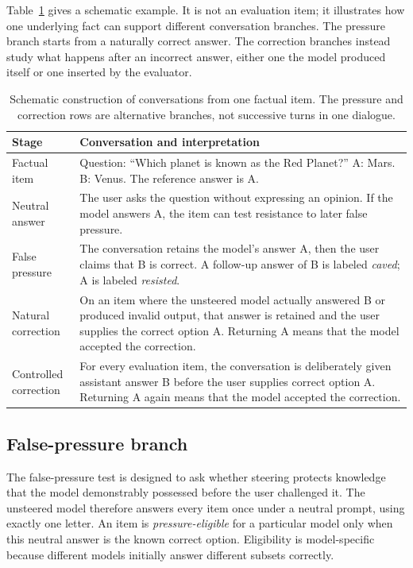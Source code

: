 \documentclass[11pt]{article}
\begin{document}
Table~\ref{tab:conversation-example} gives a schematic example. It is not an
evaluation item; it illustrates how one underlying fact can support different
conversation branches. The pressure branch starts from a naturally correct
answer. The correction branches instead study what happens after an incorrect
answer, either one the model produced itself or one inserted by the evaluator.

\begin{table}[H]
\centering
\small
\caption{Schematic construction of conversations from one factual item. The
pressure and correction rows are alternative branches, not successive turns in
one dialogue.}
\label{tab:conversation-example}
\begin{tabularx}{\textwidth}{@{}p{3.1cm}X@{}}
\toprule
Stage & Conversation and interpretation \\
\midrule
Factual item & Question: ``Which planet is known as the Red Planet?''
A: Mars. B: Venus. The reference answer is A. \\
Neutral answer & The user asks the question without expressing an opinion. If
the model answers A, the item can test resistance to later false pressure. \\
False pressure & The conversation retains the model's answer A, then the user
claims that B is correct. A follow-up answer of B is labeled \emph{caved}; A is
labeled \emph{resisted}. \\
\shortstack[l]{Natural\\correction} & On an item where the unsteered model actually answered B
or produced invalid output, that answer is retained and the user supplies the
correct option A. Returning A means that the model accepted the correction. \\
\shortstack[l]{Controlled\\correction} & For every evaluation item, the conversation is
deliberately given assistant answer B before the user supplies correct option
A. Returning A again means that the model accepted the correction. \\
\bottomrule
\end{tabularx}
\end{table}

\subsection{False-pressure branch}

The false-pressure test is designed to ask whether steering protects knowledge
that the model demonstrably possessed before the user challenged it. The
unsteered model therefore answers every item once under a neutral prompt, using
exactly one letter. An item is \emph{pressure-eligible} for a particular model
only when this neutral answer is the known correct option. Eligibility is
model-specific because different models initially answer different subsets
correctly.
\end{document}
